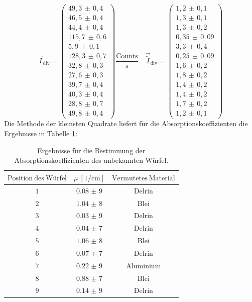 \begin{equation}
	\vec{I}_\mathrm{div}=
	\begin{pmatrix}
		49,3\,\pm\,0,4 \\
		46,5\,\pm\,0,4 \\
		44,4\,\pm\,0,4\\
		115,7\,\pm\,0,6 \\
		5,9\,\pm\,0,1 \\
    128,3\,\pm\,0,7 \\
		32,8\,\pm\,0,3 \\
		27,6\,\pm\,0,3 \\
		39,7\,\pm\,0,4 \\
		40,3\,\pm\,0,4 \\
		28,8\,\pm\,0,7 \\
    49,8\,\pm\,0,4
	\end{pmatrix}
	\frac{\mathrm{Counts}}{\si{\second}}\quad
	\vec{\tilde{I}}_\mathrm{div}=
	\begin{pmatrix}
    1,2\,\pm\,0,1 \\
		1,3\,\pm\,0,1 \\
		1,3\,\pm\,0,2 \\
		0,35\,\pm\,0,09 \\
		3,3\,\pm\,0,4 \\
    0,25\,\pm\,0,09 \\
		1,6\,\pm\,0,2 \\
		1,8\,\pm\,0,2 \\
		1,4\,\pm\,0,2 \\
		1,4\,\pm\,0,2 \\
		1,7\,\pm\,0,2 \\
    1,2\,\pm\,0,1
	\end{pmatrix}
	\label{eqn:w5}
\end{equation}
\FloatBarrier
\noindent Die Methode der kleinsten Quadrate liefert für die Absorptionskoeffizienten die Ergebnisse in Tabelle \ref{tab:tabdiv}:
\begin{table}
  \centering
  \caption{Ergebnisse für die Bestimmung der Absorptionskoeffizienten des unbekannten Würfel.}
  \label{tab:tabdiv}
  \begin{tabular}{c c c}
    \toprule
		$\mathrm{Position ~ des ~ Würfel}$ & $\mu \: [\si{1\per\centi\meter}]$ & $\mathrm{Vermutetes ~ Material}$ \\
    \midrule
    $\num{1}$ & $\num{0,08(9)}$ & $\mathrm{Delrin}$ \\
		$\num{2}$ & $\num{1,04(8)}$ & $\mathrm{Blei}$ \\
		$\num{3}$ & $\num{0,03(9)}$ & $\mathrm{Delrin}$ \\
    $\num{4}$ & $\num{0,04(7)}$ & $\mathrm{Delrin}$ \\
    $\num{5}$ & $\num{1,06(8)}$ & $\mathrm{Blei}$ \\
    $\num{6}$ & $\num{0,07(7)}$ & $\mathrm{Delrin}$ \\
    $\num{7}$ & $\num{0,22(9)}$ & $\mathrm{Aluminium}$ \\
    $\num{8}$ & $\num{0,88(7)}$ & $\mathrm{Blei}$ \\
    $\num{9}$ & $\num{0,14(9)}$ & $\mathrm{Delrin}$ \\
    \bottomrule
  \end{tabular}
\end{table}
\FloatBarrier
